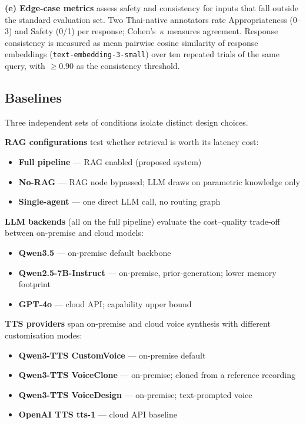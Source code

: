 \documentclass[10pt, a4paper, twocolumn]{article}
\begin{document}
\noindent\textbf{(e) Edge-case metrics} assess safety and consistency
for inputs that fall outside the standard evaluation set.
Two Thai-native annotators rate Appropriateness (0--3) and Safety (0/1)
per response; Cohen's~$\kappa$ measures agreement.
Response consistency is measured as mean pairwise cosine similarity of
response embeddings (\texttt{text-embedding-3-small}) over ten repeated
trials of the same query, with ${\geq}0.90$ as the consistency threshold.

\subsection{Baselines}
\label{sec:baselines}

Three independent sets of conditions isolate distinct design choices.

\noindent\textbf{RAG configurations} test whether retrieval is worth
its latency cost:
\begin{itemize}[nosep, leftmargin=1.6em]
  \item[(a)] \textbf{Full pipeline} --- RAG enabled (proposed system)
  \item[(b)] \textbf{No-RAG} --- RAG node bypassed; LLM draws on
             parametric knowledge only
  \item[(c)] \textbf{Single-agent} --- one direct LLM call, no
             routing graph
\end{itemize}

\noindent\textbf{LLM backends} (all on the full pipeline) evaluate the
cost--quality trade-off between on-premise and cloud models:
\begin{itemize}[nosep, leftmargin=1.6em]
  \item[(a)] \textbf{Qwen3.5} --- on-premise default backbone
  \item[(b)] \textbf{Qwen2.5-7B-Instruct} --- on-premise,
             prior-generation; lower memory footprint
  \item[(c)] \textbf{GPT-4o} --- cloud API; capability upper bound
\end{itemize}

\noindent\textbf{TTS providers} span on-premise and cloud voice
synthesis with different customisation modes:
\begin{itemize}[nosep, leftmargin=1.6em]
  \item[(a)] \textbf{Qwen3-TTS CustomVoice} --- on-premise default
  \item[(b)] \textbf{Qwen3-TTS VoiceClone} --- on-premise; cloned from
             a reference recording
  \item[(c)] \textbf{Qwen3-TTS VoiceDesign} --- on-premise;
             text-prompted voice
  \item[(d)] \textbf{OpenAI TTS tts-1} --- cloud API baseline
\end{itemize}
\end{document}
